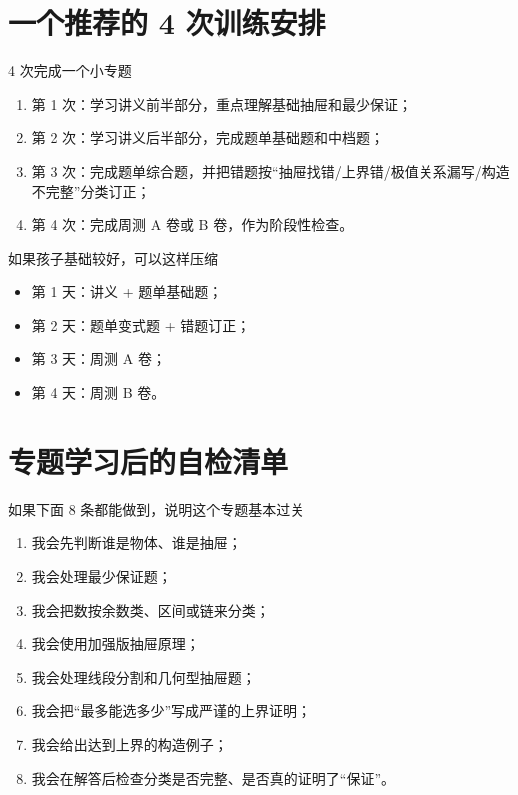 \documentclass[11pt,a4paper,fontset=fandol]{ctexart}
\begin{document}
\section{一个推荐的 4 次训练安排}

\begin{goalbox}{4 次完成一个小专题}
\begin{enumerate}
  \item 第 1 次：学习讲义前半部分，重点理解基础抽屉和最少保证；
  \item 第 2 次：学习讲义后半部分，完成题单基础题和中档题；
  \item 第 3 次：完成题单综合题，并把错题按“抽屉找错/上界错/极值关系漏写/构造不完整”分类订正；
  \item 第 4 次：完成周测 A 卷或 B 卷，作为阶段性检查。
\end{enumerate}
\end{goalbox}

\begin{infobox}{如果孩子基础较好，可以这样压缩}
\begin{itemize}
  \item 第 1 天：讲义 + 题单基础题；
  \item 第 2 天：题单变式题 + 错题订正；
  \item 第 3 天：周测 A 卷；
  \item 第 4 天：周测 B 卷。
\end{itemize}
\end{infobox}

\section{专题学习后的自检清单}

\begin{goalbox}{如果下面 8 条都能做到，说明这个专题基本过关}
\begin{enumerate}
  \item 我会先判断谁是物体、谁是抽屉；
  \item 我会处理最少保证题；
  \item 我会把数按余数类、区间或链来分类；
  \item 我会使用加强版抽屉原理；
  \item 我会处理线段分割和几何型抽屉题；
  \item 我会把“最多能选多少”写成严谨的上界证明；
  \item 我会给出达到上界的构造例子；
  \item 我会在解答后检查分类是否完整、是否真的证明了“保证”。
\end{enumerate}
\end{goalbox}
\end{document}

